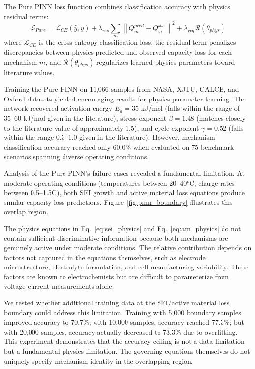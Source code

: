 \documentclass[5p,times,authoryear]{elsarticle}
\begin{document}
The Pure PINN loss function combines classification accuracy with physics residual terms:
\begin{equation}
\mathcal{L}_{Pure} = \mathcal{L}_{CE}(\hat{y}, y) + \lambda_{res} \sum_{m} \left\| Q_m^{pred} - Q_m^{obs} \right\|^2 + \lambda_{reg} \mathcal{R}(\theta_{phys})
\label{eq:pure_pinn_loss}
\end{equation}
where $\mathcal{L}_{CE}$ is the cross-entropy classification loss, the residual term penalizes discrepancies between physics-predicted and observed capacity loss for each mechanism $m$, and $\mathcal{R}(\theta_{phys})$ regularizes learned physics parameters toward literature values.

Training the Pure PINN on 11,066 samples from NASA, XJTU, CALCE, and Oxford datasets yielded encouraging results for physics parameter learning. The network recovered activation energy $E_a = 35$ kJ/mol (falls within the range of 35--60 kJ/mol given in the literature), stress exponent $\beta = 1.48$ (matches closely to the literature value of approximately 1.5), and cycle exponent $\gamma = 0.52$ (falls within the range 0.3--1.0 given in the literature). However, mechanism classification accuracy reached only 60.0\% when evaluated on 75 benchmark scenarios spanning diverse operating conditions.


Analysis of the Pure PINN's failure cases revealed a fundamental limitation. At moderate operating conditions (temperatures between 20--40°C, charge rates between 0.5--1.5C), both SEI growth and active material loss equations produce similar capacity loss predictions. Figure~\ref{fig:pinn_boundary} illustrates this overlap region.

The physics equations in Eq.~\ref{eq:sei_physics} and Eq.~\ref{eq:am_physics} do not contain sufficient discriminative information because both mechanisms are genuinely active under moderate conditions. The relative contribution depends on factors not captured in the equations themselves, such as electrode microstructure, electrolyte formulation, and cell manufacturing variability. These factors are known to electrochemists but are difficult to parameterize from voltage-current measurements alone.

We tested whether additional training data at the SEI/active material loss boundary could address this limitation. Training with 5,000 boundary samples improved accuracy to 70.7\%; with 10,000 samples, accuracy reached 77.3\%; but with 20,000 samples, accuracy actually decreased to 73.3\% due to overfitting. This experiment demonstrates that the accuracy ceiling is not a data limitation but a fundamental physics limitation. The governing equations themselves do not uniquely specify mechanism identity in the overlapping region.
\end{document}
